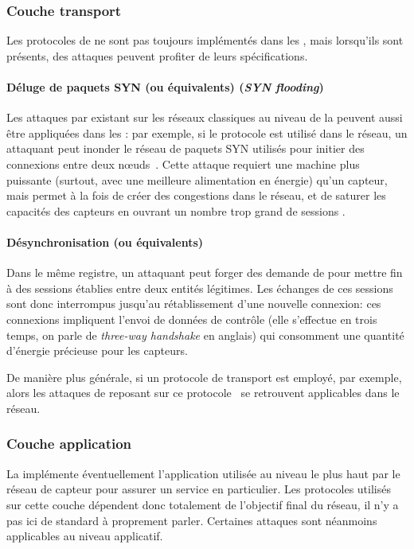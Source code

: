     \subsubsection{Couche transport}
Les protocoles de  ne sont pas toujours implémentés dans les \rcsfs, mais lorsqu'ils sont présents, des attaques peuvent profiter de leurs spécifications.

        \paragraph{Déluge de paquets SYN (ou équivalents) (\textit{SYN flooding})}
Les attaques par \dds existant sur les réseaux classiques au niveau de la  peuvent aussi être appliquées dans les \rcs: par exemple, si le protocole \tcp est utilisé dans le réseau, un attaquant peut inonder le réseau de paquets SYN utilisés pour initier des connexions entre deux nœuds~\cite{AD14}.
Cette attaque requiert une machine plus puissante (surtout, avec une meilleure alimentation en énergie) qu'un capteur, mais permet à la fois de créer des congestions dans le réseau, et de saturer les capacités des capteurs en ouvrant un nombre trop grand de sessions \tcp.

        \paragraph{Désynchronisation \tcp (ou équivalents)}
Dans le même registre, un attaquant peut forger des demande de \desync pour mettre fin à des sessions \tcp établies entre deux entités légitimes.
Les échanges de ces sessions sont donc interrompus jusqu'au rétablissement d'une nouvelle connexion: ces connexions impliquent l'envoi de données de contrôle (elle s'effectue en trois temps, on parle de \textit{three-way handshake} en anglais) qui consomment une quantité d'énergie précieuse pour les capteurs.

De manière plus générale, si un protocole de transport est employé, \tcp par exemple, alors les attaques de \dds reposant sur ce protocole~\cite{tcpsec} se retrouvent applicables dans le réseau.

    \subsubsection{Couche application}
La  implémente éventuellement l'application utilisée au niveau le plus haut par le réseau de capteur pour assurer un service en particulier.
Les protocoles utilisés sur cette couche dépendent donc totalement de l'objectif final du réseau, il n'y a pas ici de standard à proprement parler.
Certaines attaques sont néanmoins applicables au niveau applicatif.

